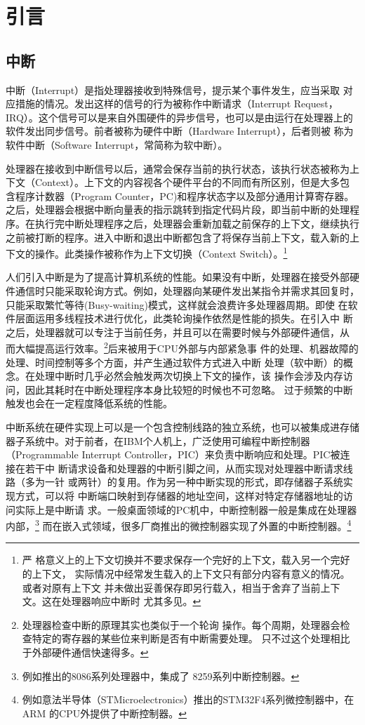 
\chapter{引言}
\label{cha:intro}

\section{中断}
\label{sec:intr}
中断（Interrupt）是指处理器接收到特殊信号，提示某个事件发生，应当采取
对应措施的情况。发出这样的信号的行为被称作中断请求（Interrupt Request，
IRQ）。这个信号可以是来自外围硬件的异步信号，也可以是由运行在处理器上的
软件发出同步信号。前者被称为硬件中断（Hardware Interrupt），后者则被
称为软件中断（Software Interrupt，常简称为软中断）。

处理器在接收到中断信号以后，通常会保存当前的执行状态，该执行状态被称为上
下文（Context）。上下文的内容视各个硬件平台的不同而有所区别，但是大多包
含程序计数器（Program Counter，PC)和程序状态字以及部分通用计算寄存器。
之后，处理器会根据中断向量表的指示跳转到指定代码片段，即当前中断的处理程
序。在执行完中断处理程序之后，处理器会重新加载之前保存的上下文，继续执行
之前被打断的程序。进入中断和退出中断都包含了将保存当前上下文，载入新的上
下文的操作。此类操作被称作为上下文切换（Context Switch）。\footnote{严
格意义上的上下文切换并不要求保存一个完好的上下文，载入另一个完好的上下文，
实际情况中经常发生载入的上下文只有部分内容有意义的情况。或者对原有上下文
并未做出妥善保存即另行载入，相当于舍弃了当前上下文。这在处理器响应中断时
尤其多见。}

人们引入中断是为了提高计算机系统的性能。如果没有中断，处理器在接受外部硬
件通信时只能采取轮询方式。例如，处理器向某硬件发出某指令并需求其回复时，
只能采取繁忙等待(Busy-waiting)模式，这样就会浪费许多处理器周期。即使
在软件层面运用多线程技术进行优化，此类轮询操作依然是性能的损失。在引入中
断之后，处理器就可以专注于当前任务，并且可以在需要时候与外部硬件通信，从
而大幅提高运行效率。\footnote{处理器检查中断的原理其实也类似于一个轮询
操作。每个周期，处理器会检查特定的寄存器的某些位来判断是否有中断需要处理。
只不过这个处理相比于外部硬件通信快速得多。}后来被用于CPU外部与内部紧急事
件的处理、机器故障的处理、时间控制等多个方面，并产生通过软件方式进入中断
处理（软中断）的概念。在处理中断时几乎必然会触发两次切换上下文的操作，该
操作会涉及内存访问，因此其耗时在中断处理程序本身比较短的时候也不可忽略。
过于频繁的中断触发也会在一定程度降低系统的性能。

中断系统在硬件实现上可以是一个包含控制线路的独立系统，也可以被集成进存储
器子系统中。对于前者，在IBM个人机上，广泛使用可编程中断控制器（Programmable 
Interrupt Controller，PIC）来负责中断响应和处理。PIC被连接在若干中
断请求设备和处理器的中断引脚之间，从而实现对处理器中断请求线路（多为一针
或两针）的复用。作为另一种中断实现的形式，即存储器子系统实现方式，可以将
中断端口映射到存储器的地址空间，这样对特定存储器地址的访问实际上是中断请
求。一般桌面领域的PC机中，中断控制器一般是集成在处理器内部，\footnote{
例如\intel{}推出的8086系列处理器中，集成了\intel{} 8259系列中断控制器。}
而在嵌入式领域，很多厂商推出的微控制器实现了外置的中断控制器。\footnote{
例如意法半导体（STMicroelectronics）推出的STM32F4系列微控制器中，在ARM
的CPU外提供了中断控制器。}

